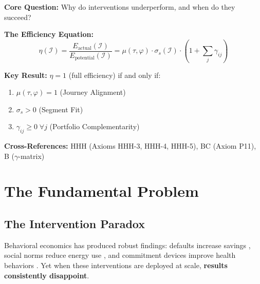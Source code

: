 
\begin{tcolorbox}[colback=blue!5!white, colframe=blue!75!black,
    title=Quick Reference: Efficient Intervention Hypothesis]

\textbf{Core Question:} Why do interventions underperform, and when do they succeed?

\textbf{The Efficiency Equation:}
\begin{equation}
\eta(\mathcal{I}) = \frac{E_{\text{actual}}(\mathcal{I})}{E_{\text{potential}}(\mathcal{I})} = \mu(\tau, \varphi) \cdot \sigma_s(\mathcal{I}) \cdot \left(1 + \sum_j \gamma_{ij}\right)
\label{eq:eih-efficiency}
\end{equation}

\textbf{Key Result:} $\eta = 1$ (full efficiency) if and only if:
\begin{enumerate}[nosep]
\item $\mu(\tau, \varphi) = 1$ \quad (Journey Alignment)
\item $\sigma_s > 0$ \quad (Segment Fit)
\item $\gamma_{ij} \geq 0 \; \forall j$ \quad (Portfolio Complementarity)
\end{enumerate}

\textbf{Cross-References:} HHH (Axioms HHH-3, HHH-4, HHH-5), BC (Axiom P11), B ($\gamma$-matrix)
\end{tcolorbox}


\section{The Fundamental Problem}
\label{sec:eih-problem}

\subsection{The Intervention Paradox}

Behavioral economics has produced robust findings: defaults increase savings
\citep{madrian2001}, social norms reduce energy use \citep{allcott2011}, and
commitment devices improve health behaviors \citep{ashraf2006}. Yet when these
interventions are deployed at scale, \textbf{results consistently disappoint}.

